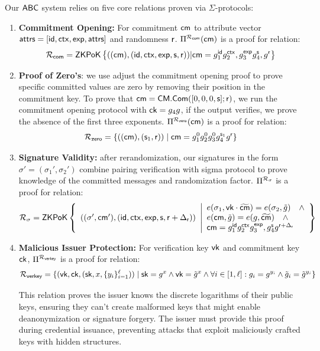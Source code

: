 Our $\mathsf{ABC}$ system relies on five core relations proven via $\Sigma$-protocols:
\begin{enumerate}
    \item \textbf{Commitment Opening:} For commitment $\mathsf{cm}$ to attribute vector $\mathsf{attrs}  = [\mathsf{id}, \mathsf{ctx}, \mathsf{exp}, \mathsf{attrs}]$ and randomness $\mathsf{r}$. $\Pi^{\mathcal{R}_{\mathsf{com}}}(\mathsf{cm})$ is a proof for relation:
    \[
     {\mathcal{R}_{\mathsf{com}}} = {\mathsf{ZKPoK}} \left\{((\mathsf{cm}), (\mathsf{id}, \mathsf{ctx}, \mathsf{exp}, \mathsf{s}, \mathsf{r}))| \mathsf{cm} = g_1^{\mathsf{id}}g_2^{\mathsf{ctx}},g_3^{\mathsf{exp}}g_4^{\mathsf{s}}, g^{\mathsf{r}} \right\}
    \]

     \item \textbf{Proof of Zero's}: we use adjust the commitment opening proof to prove specific committed values are zero by removing their position in the commitment key. To prove that $\mathsf{cm}=\mathsf{CM.Com}([0,0,0,\mathsf{s}];\mathsf{r})$, we run the commitment opening protocol with $\mathsf{ck} = g_4g$, if the output verifies, we prove the absence of the first three exponents.
     $\Pi^{\mathcal{R}_{\mathsf{zero}}}(\mathsf{cm})$ is a proof for relation: 
    \[
    {\mathcal{R}_{\mathsf{zero}}} = \{((\mathsf{cm}),(\mathsf{s}_1, \mathsf{r})) \mid \mathsf{cm} = g_1^0g_2^0g_3^0g_4^{\mathsf{s}_1}g^{\mathsf{r}} \}
    \]
     
    
    \item \textbf{Signature Validity:} after rerandomization, our signatures in the form $\sigma' = (\sigma_1', \sigma_2')$ combine pairing verification with sigma protocol to prove knowledge of the committed messages and randomization factor. $\Pi^{\mathcal{R}_{\sigma}}$ is a proof for relation:
         \[
    {\mathcal{R}_{\sigma}} = {\mathsf{ZKPoK}} \left\{ 
    \begin{array}{l} 
    ((\sigma', \mathsf{cm}'), (\mathsf{id}, \mathsf{ctx}, \mathsf{exp}, \mathsf{s}, \mathsf{r} + \Delta_{\mathsf{r}})) \\
    \end{array} 
    \middle|
    \begin{array}{l}
    e(\sigma_1, \mathsf{vk} \cdot \widetilde{\mathsf{cm}}) = e(\sigma_2, \tilde{g}) \quad \wedge \\
    e(\mathsf{cm}, \tilde{g}) = e(g, \widetilde{\mathsf{cm}}) \quad \wedge\\
    \mathsf{cm} = g_1^{\mathsf{id}}g_2^{\mathsf{ctx}}g_3^{\mathsf{exp}},g_4^{\mathsf{s}} g^{\mathsf{r} + \Delta_{\mathsf{r}}} \\
    \end{array} 
    \right\}
    \]


    \item \textbf{Malicious Issuer Protection:} For verification key $\mathsf{vk}$ and commitment key $\mathsf{ck}$, $\Pi^{\mathcal{R}_{\mathsf{verkey}}}$ is a proof for relation:
    \[
    \mathcal{R}_{\mathsf{verkey}} = \{(\mathsf{vk}, \mathsf{ck}, (\mathsf{sk}, x, \{y_i\}_{i=1}^{\ell})) \mid \mathsf{sk} = g^x \wedge \mathsf{vk} = \tilde{g}^x \wedge 
    \forall i \in [1,\ell]: g_i = g^{y_i} \wedge \tilde{g}_i = \tilde{g}^{y_i} \}
    \]
    
    This relation proves the issuer knows the discrete logarithms of their public keys, ensuring they can't create malformed keys that might enable deanonymization or signature forgery. The issuer must provide this proof during credential issuance, preventing attacks that exploit maliciously crafted keys with hidden structures.     

\end{enumerate}


